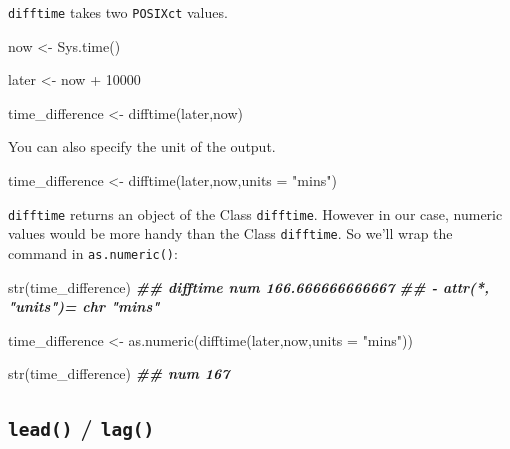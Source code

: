 \documentclass[
]{book}
\newenvironment{Shaded}{\begin{snugshade}}{\end{snugshade}}
\newcommand{\AttributeTok}[1]{\textcolor[rgb]{0.77,0.63,0.00}{#1}}
\newcommand{\DecValTok}[1]{\textcolor[rgb]{0.00,0.00,0.81}{#1}}
\newcommand{\DocumentationTok}[1]{\textcolor[rgb]{0.56,0.35,0.01}{\textbf{\textit{#1}}}}
\newcommand{\FunctionTok}[1]{\textcolor[rgb]{0.00,0.00,0.00}{#1}}
\newcommand{\NormalTok}[1]{#1}
\newcommand{\OtherTok}[1]{\textcolor[rgb]{0.56,0.35,0.01}{#1}}
\newcommand{\SpecialCharTok}[1]{\textcolor[rgb]{0.00,0.00,0.00}{#1}}
\newcommand{\StringTok}[1]{\textcolor[rgb]{0.31,0.60,0.02}{#1}}
\begin{document}
\texttt{difftime} takes two \texttt{POSIXct} values.

\begin{Shaded}
\begin{Highlighting}[]
\NormalTok{now }\OtherTok{\textless{}{-}} \FunctionTok{Sys.time}\NormalTok{()}

\NormalTok{later }\OtherTok{\textless{}{-}}\NormalTok{ now }\SpecialCharTok{+} \DecValTok{10000}

\NormalTok{time\_difference }\OtherTok{\textless{}{-}} \FunctionTok{difftime}\NormalTok{(later,now)}
\end{Highlighting}
\end{Shaded}

You can also specify the unit of the output.

\begin{Shaded}
\begin{Highlighting}[]
\NormalTok{time\_difference }\OtherTok{\textless{}{-}} \FunctionTok{difftime}\NormalTok{(later,now,}\AttributeTok{units =} \StringTok{"mins"}\NormalTok{)}
\end{Highlighting}
\end{Shaded}

\texttt{difftime} returns an object of the Class \texttt{difftime}. However in our case, numeric values would be more handy than the Class \texttt{difftime}. So we'll wrap the command in \texttt{as.numeric()}:

\begin{Shaded}
\begin{Highlighting}[]
\FunctionTok{str}\NormalTok{(time\_difference)}
\DocumentationTok{\#\#  \textquotesingle{}difftime\textquotesingle{} num 166.666666666667}
\DocumentationTok{\#\#  {-} attr(*, "units")= chr "mins"}
\end{Highlighting}
\end{Shaded}

\begin{Shaded}
\begin{Highlighting}[]
\NormalTok{time\_difference }\OtherTok{\textless{}{-}} \FunctionTok{as.numeric}\NormalTok{(}\FunctionTok{difftime}\NormalTok{(later,now,}\AttributeTok{units =} \StringTok{"mins"}\NormalTok{))}

\FunctionTok{str}\NormalTok{(time\_difference)}
\DocumentationTok{\#\#  num 167}
\end{Highlighting}
\end{Shaded}

\hypertarget{lead-lag}{%
\subsection{\texorpdfstring{\texttt{lead()} / \texttt{lag()}}{lead() / lag()}}\label{lead-lag}}
\end{document}

